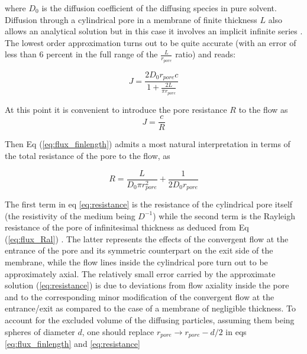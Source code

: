 \documentclass[12pt, a4paper]{article}
\begin{document}
\noindent where $D_0$ is the diffusion coefficient of the diffusing species in pure solvent. 
Diffusion through a cylindrical pore in a membrane of finite thickness $L$ also allows an analytical solution but in this case it involves an implicit infinite series \cite{Brunn1984}. 
The lowest order approximation turns out to be quite accurate (with an error of less than 6 percent in the full range of the $\frac{L}{r_{pore}}$ ratio) and reads:

\begin{equation}
    J=\frac{2D_0r_{pore}c}{1+\frac{2L}{\pi r_{pore}}}\label{eq:flux_finlength}
\end{equation}

At this point it is convenient to introduce the pore resistance $R$ to the flow as
\begin{equation}
\label{R}
J=\frac{c}{R}
\end{equation}

Then Eq (\ref{eq:flux_finlength}) admits a most natural interpretation in terms of the total resistance of the pore to the flow, as

\begin{equation}
R=\frac{L}{D_0\pi r_{pore}^{2}}+\frac{1}{2D_0r_{pore}}\label{eq:resistance}
\end{equation}

The first term in eq \ref{eq:resistance} is the resistance of the cylindrical pore itself (the resistivity of the medium being $D^{-1}$) while the second term is the 
Rayleigh resistance of the pore of infinitesimal thickness as deduced from Eq  (\ref{eq:flux_Ral}) . 
The latter represents the effects of the convergent flow at the entrance of the pore and its symmetric counterpart on the exit side of the membrane, 
while the flow lines inside the cylindrical pore turn out to be approximately axial. 
The relatively small error carried by the approximate solution  (\ref{eq:resistance})  is due to deviations from flow axiality inside the pore 
and to the corresponding minor modification of the convergent flow at the entrance/exit as compared to the case of a membrane of negligible thickness.
To account for the excluded volume of the diffusing particles, assuming them being spheres of diameter $d$, one should replace $r_{pore}\rightarrow r_{pore}-d/2$
in eqs \ref{eq:flux_finlength} and \ref{eq:resistance}

 
\end{document}
